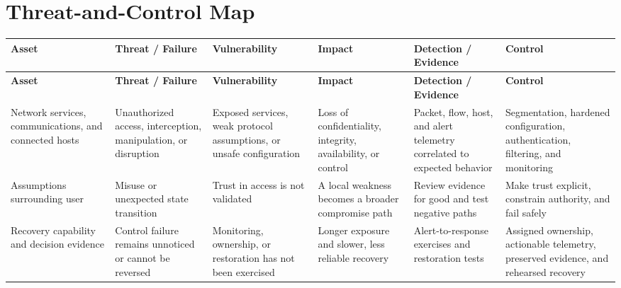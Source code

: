 \documentclass[11pt]{article}
\begin{document}
\section*{Threat-and-Control Map}
\begingroup\scriptsize\setlength{\tabcolsep}{2pt}
\begin{longtable}{>{\RaggedRight\arraybackslash}p{}>{\RaggedRight\arraybackslash}p{}>{\RaggedRight\arraybackslash}p{}>{\RaggedRight\arraybackslash}p{}>{\RaggedRight\arraybackslash}p{}>{\RaggedRight\arraybackslash}p{}}
\toprule\rowcolor{Navy}\color{white}\textbf{Asset} & \color{white}\textbf{Threat / Failure} & \color{white}\textbf{Vulnerability} & \color{white}\textbf{Impact} & \color{white}\textbf{Detection / Evidence} & \color{white}\textbf{Control}\\\midrule
\endfirsthead
\toprule\rowcolor{Navy}\color{white}\textbf{Asset} & \color{white}\textbf{Threat / Failure} & \color{white}\textbf{Vulnerability} & \color{white}\textbf{Impact} & \color{white}\textbf{Detection / Evidence} & \color{white}\textbf{Control}\\\midrule
\endhead
Network services, communications, and connected hosts & Unauthorized access, interception, manipulation, or disruption & Exposed services, weak protocol assumptions, or unsafe configuration & Loss of confidentiality, integrity, availability, or control & Packet, flow, host, and alert telemetry correlated to expected behavior & Segmentation, hardened configuration, authentication, filtering, and monitoring\\\midrule
Assumptions surrounding user & Misuse or unexpected state transition & Trust in access is not validated & A local weakness becomes a broader compromise path & Review evidence for good and test negative paths & Make trust explicit, constrain authority, and fail safely\\\midrule
Recovery capability and decision evidence & Control failure remains unnoticed or cannot be reversed & Monitoring, ownership, or restoration has not been exercised & Longer exposure and slower, less reliable recovery & Alert-to-response exercises and restoration tests & Assigned ownership, actionable telemetry, preserved evidence, and rehearsed recovery\\\midrule
\bottomrule
\end{longtable}
\endgroup
\end{document}

